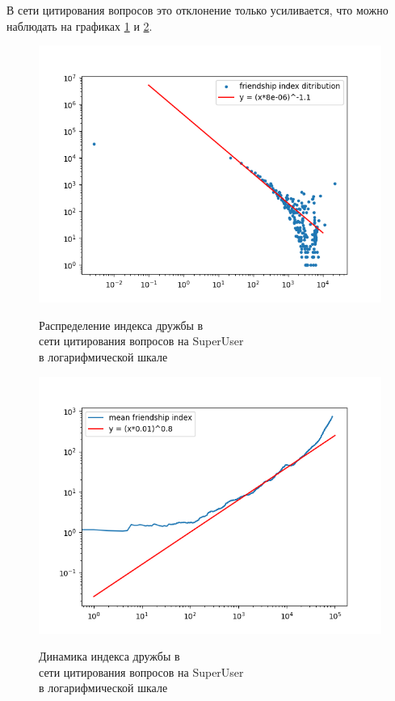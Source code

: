 \documentclass[bachelor, och, diploma]{SCWorks}
\begin{document}
В сети цитирования вопросов это отклонение только усиливается, что можно наблюдать на графиках \ref{fig:sucqs} и \ref{fig:sucqd}.
\begin{figure}[!ht]
\centering
\includegraphics[scale=0.7]{diploma_results/static_real_log/sx-superuser-c2q.png}\\
\caption{Распределение индекса дружбы  в\\ сети цитирования вопросов на SuperUser\\ в логарифмической шкале}\label{fig:sucqs}
\end{figure}
\begin{figure}[!ht]
\centering
\includegraphics[scale=0.7]{diploma_results/dynamic_real_log/sx-superuser-c2q_mean.png}\\
\caption{Динамика индекса дружбы  в\\ сети цитирования вопросов на SuperUser\\ в логарифмической шкале}\label{fig:sucqd}
\end{figure}
\end{document}
